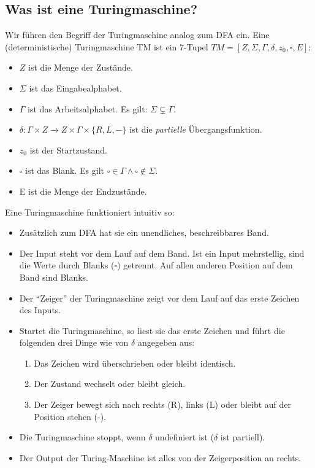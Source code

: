 \subsection{Was ist eine Turingmaschine?}

Wir führen den Begriff der Turingmaschine analog zum DFA ein.
Eine (deterministische) Turingmaschine TM ist ein 7-Tupel
$TM = [Z, \Sigma, \Gamma, \delta, z_0, \square, E]$:
\begin{itemize}
    \item $Z$ ist die Menge der Zustände.
    \item $\Sigma$ ist das Eingabealphabet.
    \item $\Gamma$ ist das Arbeitsalphabet. Es gilt: $\Sigma \subsetneq \Gamma$.
    \item $\delta: \Gamma \times Z \rightarrow Z \times \Gamma \times \{R,L,-\}$
        ist die \emph{partielle} Übergangsfunktion.
    \item $z_0$ ist der Startzustand.
    \item $\square$ ist das Blank.
        Es gilt $\square \in \Gamma \wedge \square \notin \Sigma$.
    \item E ist die Menge der Endzustände.
\end{itemize}

\noindent
Eine Turingmaschine funktioniert intuitiv so:
\begin{itemize}
    \item Zusätzlich zum DFA hat sie ein unendliches, beschreibbares Band.
    \item Der Input steht vor dem Lauf auf dem Band.
        Ist ein Input mehrstellig, sind die Werte durch Blanks ($\square$) getrennt.
        Auf allen anderen Position auf dem Band sind Blanks.
    \item Der ``Zeiger'' der Turingmaschine zeigt vor dem Lauf auf das erste Zeichen des Inputs.
    \item Startet die Turingmaschine,
        so liest sie das erste Zeichen
        und führt die folgenden drei Dinge wie von $\delta$ angegeben aus:
        \begin{enumerate}
            \item Das Zeichen wird überschrieben oder bleibt identisch.
            \item Der Zustand wechselt oder bleibt gleich.
            \item Der Zeiger bewegt sich nach
                rechts (R),
                links (L)
                oder bleibt auf der Position stehen (-).
        \end{enumerate}
    \item Die Turingmaschine stoppt,
        wenn $\delta$ undefiniert ist ($\delta$ ist partiell).
    \item Der Output der Turing-Maschine ist alles von der Zeigerposition an rechts.
\end{itemize}


